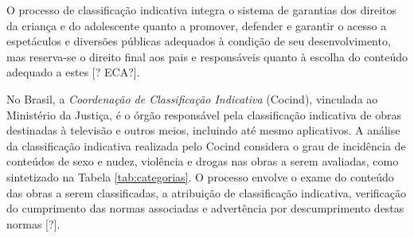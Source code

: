 O processo de classificação indicativa integra o sistema de garantias dos direitos da criança e do adolescente quanto a promover, defender e garantir o acesso a espetáculos e diversões públicas adequados à condição de seu desenvolvimento, mas reserva-se o direito final aos pais e responsáveis quanto à escolha do conteúdo adequado a estes  [? ECA?].

No Brasil, a \emph{Coordenação de Classificação Indicativa} (Cocind), vinculada ao Ministério da Justiça, é o órgão responsável pela classificação indicativa de obras destinadas à televisão e outros meios, incluindo até mesmo aplicativos. A análise da classificação indicativa realizada pelo Cocind considera o grau de incidência de conteúdos de sexo e nudez, violência e drogas nas obras a serem avaliadas, como sintetizado na Tabela \ref{tab:categorias}. O processo envolve o exame do conteúdo das obras a serem classificadas, a atribuição de classificação indicativa, verificação do cumprimento das normas associadas e advertência por descumprimento destas normas [?].




